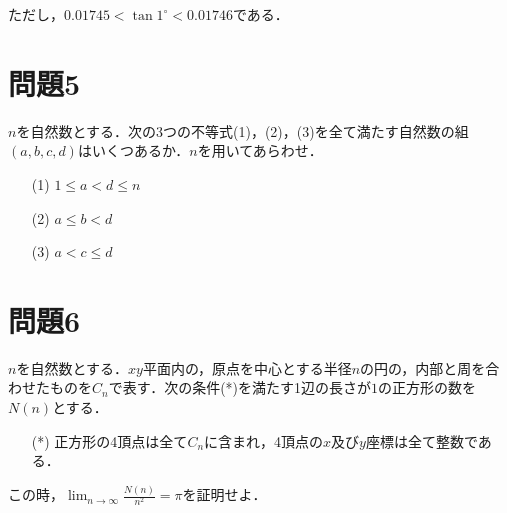 \documentclass[unicode,12pt, A4j]{ltjsarticle}%
\begin{document}
ただし，$0.01745<\tan 1^{\circ} < 0.01746$である．


\section{問題5}
$n$を自然数とする．次の3つの不等式(1)，(2)，(3)を全て満たす自然数の組$(a,b,c,d)$はいくつあるか．$n$を用いてあらわせ．
\begin{itemize}
 \item[(1)] $1\le a < d \le n$
 \item[(2)] $a\le b < d$
 \item[(3)] $a<c\le d$
\end{itemize}

\section{問題6}
$n$を自然数とする．$xy$平面内の，原点を中心とする半径$n$の円の，内部と周を合わせたものを$C_n$で表す．次の条件(*)を満たす1辺の長さが$1$の正方形の数を$N(n)$とする．

\begin{itemize}
 \item[(*)] 正方形の4頂点は全て$C_n$に含まれ，4頂点の$x$及び$y$座標は全て整数である．
\end{itemize}

この時，${\displaystyle \lim_{n\to\infty}\frac{N(n)}{n^2}=\pi}$を証明せよ．
\end{document}

